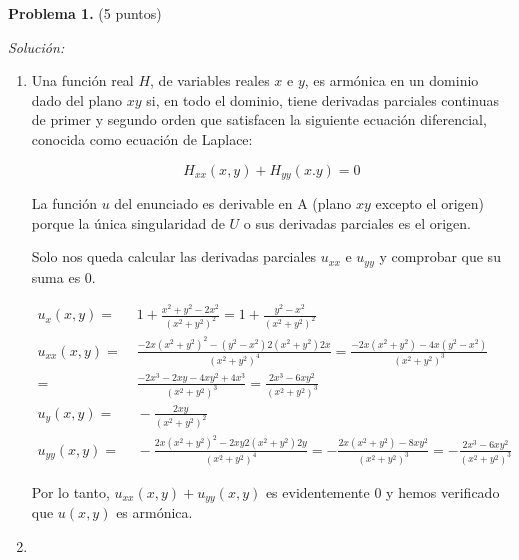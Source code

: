 \textbf{Problema 1.} (5 puntos)

\vspace{20px}
\textit{Solución:}
\\

\begin{enumerate}
[label=\alph*)]
    \item Una función real $H$, de variables reales $x$ e $y$, es armónica en un dominio dado del plano $xy$ si,
    en todo el dominio,
    tiene derivadas parciales continuas de primer y segundo orden que satisfacen la siguiente ecuación diferencial, conocida
    como ecuación de Laplace:

    \begin{equation*}
        H_{xx}(x,y) + H_{yy}(x.y) = 0
    \end{equation*}

    La función $u$ del enunciado es derivable en A (plano $xy$ excepto el origen) porque la única singularidad de $U$ o sus
    derivadas parciales es el origen.

    Solo nos queda calcular las derivadas parciales $u_{xx}$ e $u_{yy}$ y comprobar que su suma es 0.

    \begin{align*}
        u_{x}(x,y) = & \;1 + \frac{x^2 + y^2 - 2x^2}{(x^2 + y^2)^2} = 1 + \frac{y^2 - x^2}{(x^2 + y^2)^2} \\[20pt]
        u_{xx}(x,y) = & \;\frac{-2x(x^2 + y^2)^2 - (y^2 - x^2)2(x^2 + y^2)2x}{(x^2 + y^2)^4} =
        \frac{-2x(x^2 + y^2) - 4x(y^2 - x^2)}{(x^2 + y^2)^3}  \\
        = & \; \frac{-2x^3 -2xy -4xy^2 + 4x^3}{(x^2 + y^2)^3} =
        \frac{2x^3 - 6xy^2}{(x^2 + y^2)^3} \\[20pt]
        u_{y}(x,y) = & \; - \frac{2xy}{(x^2 + y^2)^2} \\[20pt]
        u_{yy}(x,y) = & \; - \frac{2x(x^2 + y^2)^2 - 2xy2(x^2+y^2)2y}{(x^2 + y^2)^4}
        = - \frac{2x(x^2 + y^2) - 8xy^2}{(x^2 + y^2)^3} = - \frac{2x^3 - 6xy^2}{(x^2+y^2)^3}
    \end{align*}

    Por lo tanto, $u_{xx}(x,y) + u_{yy}(x,y)$ es evidentemente $0$ y hemos verificado que $u(x,y)$ es armónica.


    \vspace{20px}
    \item


\end{enumerate}